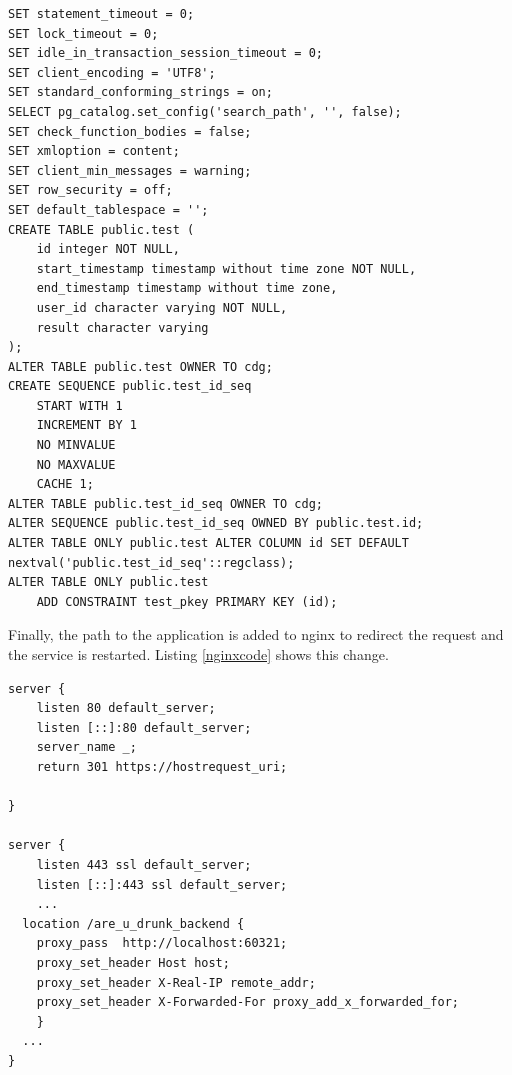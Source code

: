 \begin{lstlisting}[label={dbscript}, caption={Script to create the table for the tests}, captionpos=b]
SET statement_timeout = 0;
SET lock_timeout = 0;
SET idle_in_transaction_session_timeout = 0;
SET client_encoding = 'UTF8';
SET standard_conforming_strings = on;
SELECT pg_catalog.set_config('search_path', '', false);
SET check_function_bodies = false;
SET xmloption = content;
SET client_min_messages = warning;
SET row_security = off;
SET default_tablespace = '';
CREATE TABLE public.test (
    id integer NOT NULL,
    start_timestamp timestamp without time zone NOT NULL,
    end_timestamp timestamp without time zone,
    user_id character varying NOT NULL,
    result character varying
);
ALTER TABLE public.test OWNER TO cdg;
CREATE SEQUENCE public.test_id_seq
    START WITH 1
    INCREMENT BY 1
    NO MINVALUE
    NO MAXVALUE
    CACHE 1;
ALTER TABLE public.test_id_seq OWNER TO cdg;
ALTER SEQUENCE public.test_id_seq OWNED BY public.test.id;
ALTER TABLE ONLY public.test ALTER COLUMN id SET DEFAULT nextval('public.test_id_seq'::regclass);
ALTER TABLE ONLY public.test
    ADD CONSTRAINT test_pkey PRIMARY KEY (id);
\end{lstlisting}

Finally, the path to the application is added to nginx to redirect the request and the service is restarted. Listing \ref{nginxcode} shows this change.

\begin{lstlisting}[label={nginxcode}, caption={Nginx configuration file}, captionpos=b, mathescape]
server {
	listen 80 default_server;
	listen [::]:80 default_server;
	server_name _;
	return 301 https://hostrequest_uri;

}

server {
	listen 443 ssl default_server;
	listen [::]:443 ssl default_server;
	...
  location /are_u_drunk_backend {
    proxy_pass  http://localhost:60321;
    proxy_set_header Host host;
    proxy_set_header X-Real-IP remote_addr;
    proxy_set_header X-Forwarded-For proxy_add_x_forwarded_for;
	}
  ...
}
\end{lstlisting}
